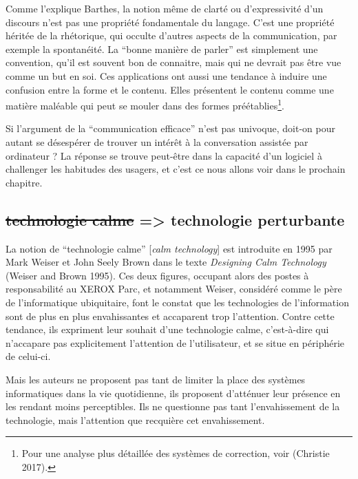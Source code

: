 \documentclass[]{article}
\begin{document}
Comme l'explique Barthes, la notion même de clarté ou d'expressivité
d'un discours n'est pas une propriété fondamentale du langage. C'est une
propriété héritée de la rhétorique, qui occulte d'autres aspects de la
communication, par exemple la spontanéité. La ``bonne manière de
parler'' est simplement une convention, qu'il est souvent bon de
connaitre, mais qui ne devrait pas être vue comme un but en soi. Ces
applications ont aussi une tendance à induire une confusion entre la
forme et le contenu. Elles présentent le contenu comme une matière
maléable qui peut se mouler dans des formes préétablies\footnote{Pour
  une analyse plus détaillée des systèmes de correction, voir (Christie
  2017).}.

Si l'argument de la ``communication efficace'' n'est pas univoque,
doit-on pour autant se désespérer de trouver un intérêt à la
conversation assistée par ordinateur ? La réponse se trouve peut-être
dans la capacité d'un logiciel à challenger les habitudes des usagers,
et c'est ce nous allons voir dans le prochain chapitre.

\newpage

\hypertarget{technologie-calme-technologie-perturbante}{%
\subsection{\texorpdfstring{\sout{technologie calme} =\textgreater{}
technologie
perturbante}{technologie calme =\textgreater{} technologie perturbante}}\label{technologie-calme-technologie-perturbante}}

La notion de ``technologie calme'' {[}\emph{calm technology}{]} est
introduite en 1995 par Mark Weiser et John Seely Brown dans le texte
\emph{Designing Calm Technology} (Weiser and Brown 1995). Ces deux
figures, occupant alors des postes à responsabilité au XEROX Parc, et
notamment Weiser, considéré comme le père de l'informatique ubiquitaire,
font le constat que les technologies de l'information sont de plus en
plus envahissantes et accaparent trop l'attention. Contre cette
tendance, ils expriment leur souhait d'une technologie calme,
c'est-à-dire qui n'accapare pas explicitement l'attention de
l'utilisateur, et se situe en périphérie de celui-ci.

Mais les auteurs ne proposent pas tant de limiter la place des systèmes
informatiques dans la vie quotidienne, ils proposent d'atténuer leur
présence en les rendant moins perceptibles. Ils ne questionne pas tant
l'envahissement de la technologie, mais l'attention que recquière cet
envahissement.
\end{document}
